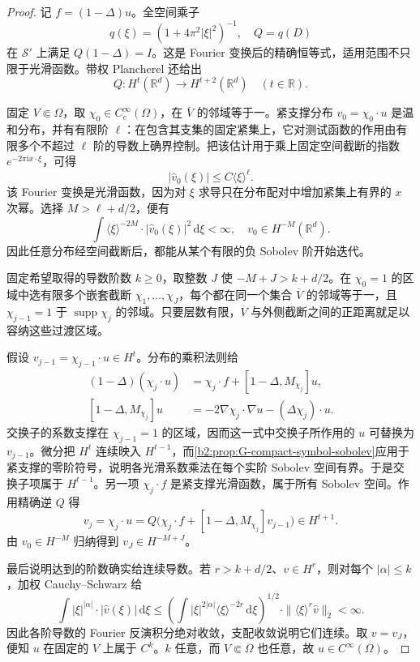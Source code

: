 \begin{proof}
记 \(f=(1-\Delta)u\)。全空间乘子
\[
 q(\xi)=(1+4\pi^2|\xi|^2)^{-1},
 \quad Q=q(D)
\]
在 \(\mathcal S'\) 上满足 \(Q(1-\Delta)=I\)。这是 Fourier 变换后的精确恒等式，适用范围不只限于光滑函数。带权 Plancherel 还给出
\[
 Q:H^t(\mathbb R^d)\longrightarrow H^{t+2}(\mathbb R^d)
 \quad(t\in\mathbb R).
\]

固定 \(V\Subset\Omega\)，取 \(\chi_0\in C_c^\infty(\Omega)\)，在 \(\overline V\) 的邻域等于一。紧支撑分布 \(v_0=\chi_0\cdot u\) 是温和分布，并有有限阶 \(\ell\)：在包含其支集的固定紧集上，它对测试函数的作用由有限多个不超过 \(\ell\) 阶的导数上确界控制。把该估计用于乘上固定空间截断的指数 \(e^{-2\pi\mathrm ix\cdot\xi}\)，可得
\[
 |\widehat v_0(\xi)|\le C\langle\xi\rangle^\ell.
\]
该 Fourier 变换是光滑函数，因为对 \(\xi\) 求导只在分布配对中增加紧集上有界的 \(x\) 次幂。选择 \(M>\ell+d/2\)，便有
\[
 \int\langle\xi\rangle^{-2M}\cdot|\widehat v_0(\xi)|^2
                  \,\mathrm d\xi<\infty,
 \quad v_0\in H^{-M}(\mathbb R^d).
\]
因此任意分布经空间截断后，都能从某个有限的负 Sobolev 阶开始迭代。

固定希望取得的导数阶数 \(k\ge0\)，取整数 \(J\) 使 \(-M+J>k+d/2\)。在 \(\chi_0=1\) 的区域中选有限多个嵌套截断 \(\chi_1,\ldots,\chi_J\)，每个都在同一个集合 \(\overline V\) 的邻域等于一，且 \(\chi_{j-1}=1\) 于 \(\operatorname{supp}\chi_j\) 的邻域。只要层数有限，\(\overline V\) 与外侧截断之间的正距离就足以容纳这些过渡区域。

假设 \(v_{j-1}=\chi_{j-1}\cdot u\in H^t\)。分布的乘积法则给
\[
 \begin{split}
 (1-\Delta)(\chi_j\cdot u)
 &=\chi_j\cdot f+[1-\Delta,M_{\chi_j}]u,\\
 [1-\Delta,M_{\chi_j}]u
 &=-2\nabla\chi_j\cdot\nabla u-(\Delta\chi_j)\cdot u.
 \end{split}
\]
交换子的系数支撑在 \(\chi_{j-1}=1\) 的区域，因而这一式中交换子所作用的 \(u\) 可替换为 \(v_{j-1}\)。微分把 \(H^t\) 连续映入 \(H^{t-1}\)，而\cref{b2:prop:G-compact-symbol-sobolev}应用于紧支撑的零阶符号，说明各光滑系数乘法在每个实阶 Sobolev 空间有界。于是交换子项属于 \(H^{t-1}\)。另一项 \(\chi_j\cdot f\) 是紧支撑光滑函数，属于所有 Sobolev 空间。作用精确逆 \(Q\) 得
\[
 v_j=\chi_j\cdot u
 =Q\bigl(\chi_j\cdot f+[1-\Delta,M_{\chi_j}]v_{j-1}\bigr)
 \in H^{t+1}.
\]
由 \(v_0\in H^{-M}\) 归纳得到 \(v_J\in H^{-M+J}\)。

最后说明达到的阶数确实给连续导数。若 \(r>k+d/2\)、\(v\in H^r\)，则对每个 \(|\alpha|\le k\)，加权 Cauchy--Schwarz 给
\[
 \int |\xi|^{|\alpha|}\cdot|\widehat v(\xi)|\,\mathrm d\xi
 \le
 \left(\int |\xi|^{2|\alpha|}\langle\xi\rangle^{-2r}
                      \,\mathrm d\xi\right)^{1/2}
 \cdot\|\langle\xi\rangle^r\widehat v\|_2<\infty.
\]
因此各阶导数的 Fourier 反演积分绝对收敛，支配收敛说明它们连续。取 \(v=v_J\)，便知 \(u\) 在固定的 \(V\) 上属于 \(C^k\)。\(k\) 任意，而 \(V\Subset\Omega\) 也任意，故 \(u\in C^\infty(\Omega)\)。
\end{proof}

